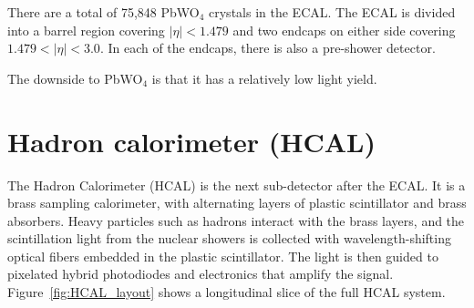 There are a total of 75,848 PbWO$_4$ crystals in the ECAL. The ECAL is divided into a barrel region covering $|\eta| < 1.479$ and two endcaps on either side covering $1.479 < |\eta| < 3.0$. In each of the endcaps, there is also a pre-shower detector. 

The downside to PbWO$_4$ is that it has a relatively low light yield. 



\section{Hadron calorimeter (HCAL)}
\label{sec:HCAL}
The Hadron Calorimeter (HCAL) is the next sub-detector after the ECAL. It is a brass sampling calorimeter, with alternating layers of plastic scintillator and brass absorbers. 
Heavy particles such as hadrons interact with the brass layers, and the scintillation light from the nuclear showers is collected with wavelength-shifting optical fibers embedded in the plastic scintillator. The light is then guided to pixelated hybrid photodiodes and electronics that amplify the signal. Figure~\ref{fig:HCAL_layout} shows a longitudinal slice of the full HCAL system. 


